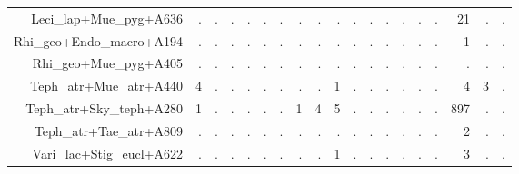 \documentclass[a4paper, 11]{article}\usepackage[]{graphicx}\usepackage[]{color}
\begin{document}
\begin{table}
\begin{tabular}{rrrrrrrrrrrrrrrrrrr}
  Leci\_lap+Mue\_pyg+A636 & . & . & . & . & . & . & . & . & . & . & . & . & . & . & . & 21 & . & . \\ 
  Rhi\_geo+Endo\_macro+A194 & . & . & . & . & . & . & . & . & . & . & . & . & . & . & . & 1 & . & . \\ 
  Rhi\_geo+Mue\_pyg+A405 & . & . & . & . & . & . & . & . & . & . & . & . & . & . & . & . & . & . \\ 
  Teph\_atr+Mue\_atr+A440 & 4 & . & . & . & . & . & . & . & 1 & . & . & . & . & . & . & 4 & 3 & . \\ 
  Teph\_atr+Sky\_teph+A280 & 1 & . & . & . & . & . & 1 & 4 & 5 & . & . & . & . & . & . & 897 & . & . \\ 
  Teph\_atr+Tae\_atr+A809 & . & . & . & . & . & . & . & . & . & . & . & . & . & . & . & 2 & . & . \\ 
  Vari\_lac+Stig\_eucl+A622 & . & . & . & . & . & . & . & . & 1 & . & . & . & . & . & . & 3 & . & . \\ 
   \hline
\end{tabular}
\end{table}
\end{document}
